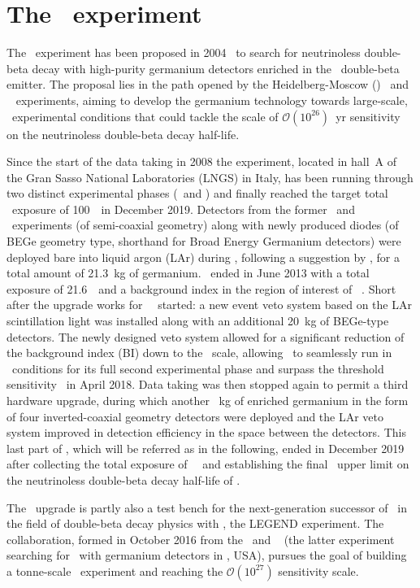 \chapter{The \gerda\ experiment}\label{chap:gerda}

The \gerda\ experiment has been proposed in 2004~\cite{gerda-proposal} to search for
neutrinoless double-beta decay with high-purity germanium detectors enriched in the
\gesix\ double-beta emitter. The proposal lies in the path opened by the Heidelberg-Moscow
(\hdm)~\cite{Klapdor2001} and \igex~\cite{Aalseth2002} experiments, aiming to develop the
germanium technology towards large-scale, \bkgfree\ experimental conditions that
could tackle the scale of $\mathcal{O}(10^{26})$~yr sensitivity on the neutrinoless
double-beta decay half-life.

Since the start of the data taking in 2008 the experiment, located in hall~A of the Gran
Sasso National Laboratories (LNGS) in Italy, has been running through two distinct
experimental phases (\phaseone\ and \phasetwo) and finally reached the target total
\bkgfree\ exposure of 100~\kgyr\ in December 2019. Detectors from the former \hdm\ and
\igex\ experiments (of semi-coaxial geometry) along with newly produced diodes (of BEGe
geometry type, shorthand for Broad Energy Germanium detectors) were deployed bare into
liquid argon (LAr) during \phaseone, following a suggestion by \fillme, for a total amount
of 21.3~kg of germanium. \phaseone\ ended in June 2013 with a total exposure of
21.6~\kgyr\ and a background index in the region of interest of \pIbi~\cite{Agostini2016}.
Short after the upgrade works for \gerda\ \phasetwo\ started: a new event veto system
based on the LAr scintillation light was installed along with an additional 20~kg of
BEGe-type detectors.  The newly designed veto system allowed for a significant reduction
of the background index (BI) down to the \vctsper\ scale, allowing \gerda\ to seamlessly
run in \bkgfree\ conditions for its full second experimental phase and surpass the
 threshold sensitivity~\cite{Agostini2019} in April 2018. Data taking was
then stopped again to permit a third hardware upgrade, during which another \fillme~kg of
enriched germanium in the form of four inverted-coaxial geometry detectors were deployed
and the LAr veto system improved in detection efficiency in the space between the
detectors. This last part of \phasetwo, which will be referred as \phasetwop in the
following, ended in December 2019 after collecting the total exposure of \fillme~\kgyr\
and establishing the final \gerda\ upper limit on the neutrinoless double-beta decay
half-life of \gerdafinallimit.

The \phasetwop\ upgrade is partly also a test bench for the next-generation successor of
\gerda\ in the field of double-beta decay physics with \gesix, the LEGEND experiment. The
collaboration, formed in October 2016 from the \gerda\ and \majorana~\cite{Abgrall2014}
(the latter experiment searching for \onbb\ with germanium detectors in \fillme, USA),
pursues the goal of building a tonne-scale \gesix\ experiment and reaching the
$\mathcal{O}(10^{27})$ sensitivity scale.

